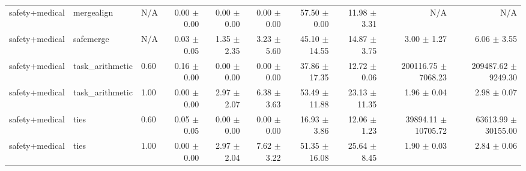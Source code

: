 \documentclass{article}
\begin{document}
\begin{table}[H]
{\begin{tabular}{lllrrrrrrr}
safety+medical & mergealign & N/A & 0.00 $\pm$ 0.00 & 0.00 $\pm$ 0.00 & 0.00 $\pm$ 0.00 & 57.50 $\pm$ 0.00 & 11.98 $\pm$ 3.31 & N/A & N/A \\
safety+medical & safemerge & N/A & 0.03 $\pm$ 0.05 & 1.35 $\pm$ 2.35 & 3.23 $\pm$ 5.60 & 45.10 $\pm$ 14.55 & 14.87 $\pm$ 3.75 & 3.00 $\pm$ 1.27 & 6.06 $\pm$ 3.55 \\
safety+medical & task\_arithmetic & 0.60 & 0.16 $\pm$ 0.00 & 0.00 $\pm$ 0.00 & 0.00 $\pm$ 0.00 & 37.86 $\pm$ 17.35 & 12.72 $\pm$ 0.06 & 200116.75 $\pm$ 7068.23 & 209487.62 $\pm$ 9249.30 \\
safety+medical & task\_arithmetic & 1.00 & 0.00 $\pm$ 0.00 & 2.97 $\pm$ 2.07 & 6.38 $\pm$ 3.63 & 53.49 $\pm$ 11.88 & 23.13 $\pm$ 11.35 & 1.96 $\pm$ 0.04 & 2.98 $\pm$ 0.07 \\
safety+medical & ties & 0.60 & 0.05 $\pm$ 0.05 & 0.00 $\pm$ 0.00 & 0.00 $\pm$ 0.00 & 16.93 $\pm$ 3.86 & 12.06 $\pm$ 1.23 & 39894.11 $\pm$ 10705.72 & 63613.99 $\pm$ 30155.00 \\
safety+medical & ties & 1.00 & 0.00 $\pm$ 0.00 & 2.97 $\pm$ 2.04 & 7.62 $\pm$ 3.22 & 51.35 $\pm$ 16.08 & 25.64 $\pm$ 8.45 & 1.90 $\pm$ 0.03 & 2.84 $\pm$ 0.06 \\
\bottomrule
\end{tabular}
}
\end{table}


\begin{table}[H]
\centering
\caption{メイン実験 シード別詳細 - Method: safemerge, Pattern: safety+medical}
\label{tab:main_seeds_safemerge_safety_medical}
\small
{}
\end{table}
\end{document}
